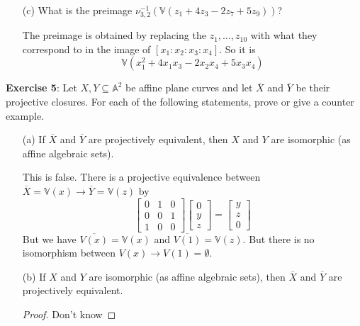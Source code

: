 \documentclass{article}
\begin{document}
\begin{itemize}
        \item [(c)] What is the preimage $\nu_{3, 2}^{-1}(\mathbb{V}(z_{1} + 4z_{3} - 2z_{7} + 5z_{9}))$? 
            \begin{answer}
                The preimage is obtained by replacing the $z_{1}, \ldots, z_{10}$ with what they correspond to in the image of $[x_{1}: x_{2} : x_{3} : x_{4}]$. So it is
                    \begin{equation*}
                        \mathbb{V}(x_{1}^{2} + 4x_{1}x_{3} - 2x_{2}x_{4} + 5x_{3}x_{4})
                    \end{equation*} 
            \end{answer}
    \end{itemize}

\textbf{Exercise 5}: Let $X, Y \subseteq \mathbb{A}^{2}$ be affine plane curves and let $\overline{X}$ and $\overline{Y}$ be their projective closures. For each of the following statements, prove or give a counter example.
    \begin{itemize}
        \item [(a)] If $\overline{X}$ and $\overline{Y}$ are projectively equivalent, then $X$ and $Y$ are isomorphic (as affine algebraic sets).
            \begin{answer}
                This is false. There is a projective equivalence between $\overline{X} = \mathbb{V}(x) \rightarrow \overline{Y} = \mathbb{V}(z)$ by 
                    \begin{equation*}
                        \begin{bmatrix}
                            0 & 1 & 0 \\
                            0 & 0 & 1 \\
                            1 & 0 & 0   
                        \end{bmatrix} \begin{bmatrix}
                            0 \\
                            y \\
                            z   
                        \end{bmatrix} = \begin{bmatrix}
                            y \\
                            z \\
                            0   
                        \end{bmatrix}
                    \end{equation*}
                But we have $\overline{V(x)} = \mathbb{V}(x)$ and $\overline{V(1)} = \mathbb{V}(z)$. But there is no isomorphism between $V(x) \rightarrow V(1) = \emptyset$.
            \end{answer}

        \item [(b)] If $X$ and $Y$ are isomorphic (as affine algebraic sets), then $\overline{X}$ and $\overline{Y}$ are projectively equivalent. 
            \begin{proof}
                Don't know
            \end{proof}
    \end{itemize}
\end{document}
